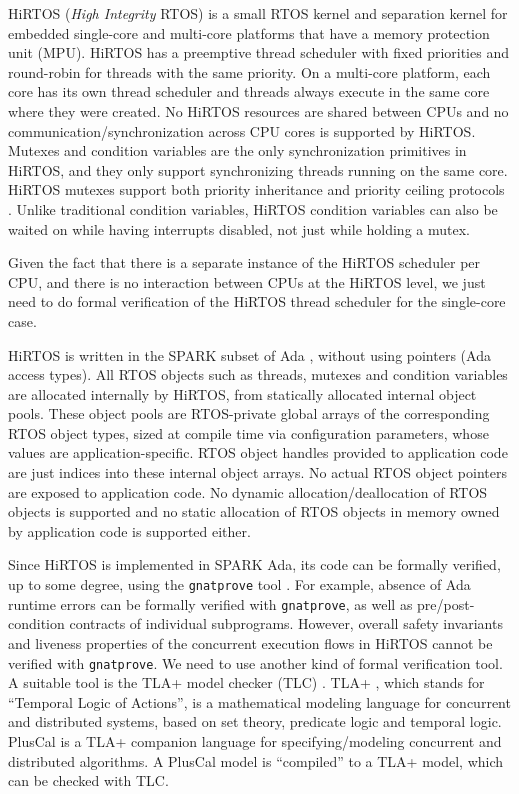 \documentclass[sigplan,anonymous,10pt]{acmart}
\begin{document}
HiRTOS (\emph{High Integrity} RTOS) \cite{HiRTOS} is a small RTOS 
kernel and separation kernel for embedded single-core and multi-core 
platforms that have a memory protection unit (MPU).
HiRTOS has a preemptive thread scheduler with fixed priorities and
round-robin for threads with the same priority.
On a multi-core platform, each core has its own thread scheduler and threads
always execute in the same core where they were created. No HiRTOS resources
are shared between CPUs and no communication/synchronization across CPU
cores is supported by HiRTOS. Mutexes and condition variables \cite{mutexAndCV}
are the only synchronization primitives in HiRTOS, and they only support
synchronizing threads running on the same core. HiRTOS mutexes support both
priority inheritance and priority ceiling protocols \cite{prioCeiling}.
Unlike traditional condition variables, HiRTOS condition variables
can also be waited on while having interrupts disabled, not just while holding
a mutex.

Given the fact that there is a separate instance of the HiRTOS scheduler per CPU,
and there is no interaction between CPUs at the HiRTOS level, we just need to do
formal verification of the HiRTOS thread scheduler for the single-core case.

HiRTOS is written in the SPARK subset of Ada \cite{SparkAda}, without using pointers (Ada access types).
All RTOS objects such as threads, mutexes and condition variables are allocated internally
by HiRTOS, from statically allocated internal object pools. 
These object pools are RTOS-private global arrays of the corresponding RTOS object types,
sized at compile time via configuration parameters, whose values are application-specific.
RTOS object handles provided to application code are just indices into these internal object arrays.
No actual RTOS object pointers are exposed to application code.
No dynamic allocation/deallocation of RTOS objects is supported and no static allocation of RTOS
objects in memory owned by application code is supported either.

Since HiRTOS is implemented in SPARK Ada, its code can be formally verified, up to some
degree, using the \verb'gnatprove' tool \cite{gnatprove}. For example, absence of Ada
runtime errors can be formally verified with \verb'gnatprove', as well as pre/post-condition
contracts of individual subprograms. However, overall safety invariants and liveness
properties of the concurrent execution flows in HiRTOS cannot be verified with
\verb'gnatprove'. We need to use another kind of formal verification tool.
A suitable tool is the TLA+ model checker (TLC) \cite{tlc}.
TLA+ \cite{tla1}, which
stands for ``Temporal Logic of Actions'', is a mathematical modeling language for concurrent
and distributed systems, based on set theory, predicate logic and temporal logic.
PlusCal \cite{PlusCal,tla2} is
a TLA+ companion language for specifying/modeling concurrent and distributed algorithms.
A PlusCal model is ``compiled'' to a TLA+ model, which can be checked with TLC. 
\end{document}
